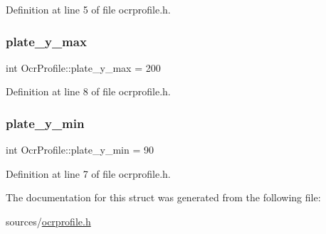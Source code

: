 Definition at line 5 of file ocrprofile.\+h.

\mbox{\label{struct_ocr_profile_a1dc6c83e22df80a43c4f29d142e6d3a0}} 
\subsubsection{\texorpdfstring{plate\+\_\+y\+\_\+max}{plate\_y\_max}}
{\footnotesize\ttfamily int Ocr\+Profile\+::plate\+\_\+y\+\_\+max = 200}



Definition at line 8 of file ocrprofile.\+h.

\mbox{\label{struct_ocr_profile_a484eb61bf662829fab9a5a01da3c6fad}} 
\subsubsection{\texorpdfstring{plate\+\_\+y\+\_\+min}{plate\_y\_min}}
{\footnotesize\ttfamily int Ocr\+Profile\+::plate\+\_\+y\+\_\+min = 90}



Definition at line 7 of file ocrprofile.\+h.



The documentation for this struct was generated from the following file\+:\begin{DoxyCompactItemize}
\item 
sources/\mbox{\hyperlink{ocrprofile_8h}{ocrprofile.\+h}}\end{DoxyCompactItemize}
